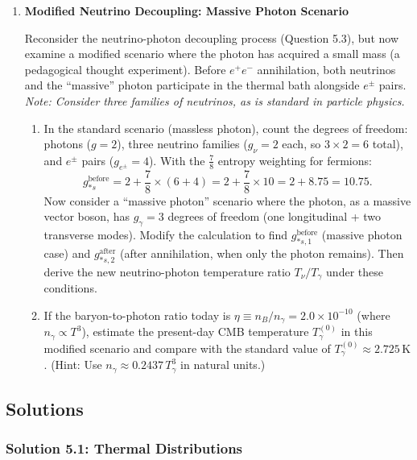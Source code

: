 \begin{enumerate}[label=5.\arabic*]
  \item \label{q:5.4} \textbf{Modified Neutrino Decoupling: Massive Photon Scenario}

  Reconsider the neutrino-photon decoupling process (Question 5.3), but now examine a modified scenario where the photon has acquired a small mass (a pedagogical thought experiment). Before $e^+e^-$ annihilation, both neutrinos and the ``massive'' photon participate in the thermal bath alongside $e^\pm$ pairs. \textit{Note: Consider three families of neutrinos, as is standard in particle physics.}
  
  \begin{enumerate}[label=(\alph*)]
    \item 
    In the standard scenario (massless photon), count the degrees of freedom: photons ($g=2$), three neutrino families ($g_\nu=2$ each, so $3 \times 2 = 6$ total), and $e^\pm$ pairs ($g_{e^\pm}=4$). With the $\frac{7}{8}$ entropy weighting for fermions:
    \[
      g_{*s}^{\mathrm{before}} = 2 + \frac{7}{8}\times(6+4) = 2 + \frac{7}{8}\times 10 = 2 + 8.75 = 10.75.
    \]
    Now consider a ``massive photon'' scenario where the photon, as a massive vector boson, has $g_\gamma = 3$ degrees of freedom (one longitudinal + two transverse modes). Modify the calculation to find $g_{*s,1}^{\mathrm{before}}$ (massive photon case) and $g_{*s,2}^{\mathrm{after}}$ (after annihilation, when only the photon remains). Then derive the new neutrino-photon temperature ratio $T_\nu/T_\gamma$ under these conditions.
    
    \item If the baryon-to-photon ratio today is $\eta \equiv n_B/n_\gamma = 2.0 \times 10^{-10}$ (where $n_\gamma \propto T^3$), estimate the present-day CMB temperature $T_{\gamma}^{(0)}$ in this modified scenario and compare with the standard value of $T_{\gamma}^{(0)} \approx 2.725\,\mathrm{K}$. (Hint: Use $n_\gamma \approx 0.2437\, T_\gamma^3$ in natural units.)
  \end{enumerate}
\end{enumerate}

\bigskip
\bigskip
\bigskip

\subsection{Solutions}

\subsubsection*{Solution 5.1: Thermal Distributions}

